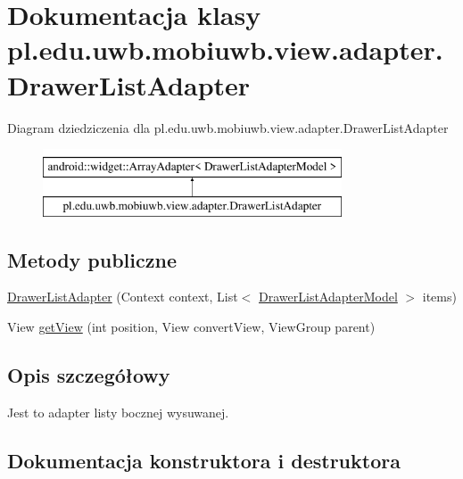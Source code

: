 \hypertarget{classpl_1_1edu_1_1uwb_1_1mobiuwb_1_1view_1_1adapter_1_1_drawer_list_adapter}{}\section{Dokumentacja klasy pl.\+edu.\+uwb.\+mobiuwb.\+view.\+adapter.\+Drawer\+List\+Adapter}
\label{classpl_1_1edu_1_1uwb_1_1mobiuwb_1_1view_1_1adapter_1_1_drawer_list_adapter}
Diagram dziedziczenia dla pl.\+edu.\+uwb.\+mobiuwb.\+view.\+adapter.\+Drawer\+List\+Adapter\begin{figure}[H]
\begin{center}
\leavevmode
\includegraphics[height=2.000000cm]{classpl_1_1edu_1_1uwb_1_1mobiuwb_1_1view_1_1adapter_1_1_drawer_list_adapter}
\end{center}
\end{figure}
\subsection*{Metody publiczne}
\begin{DoxyCompactItemize}
\item 
\hyperlink{classpl_1_1edu_1_1uwb_1_1mobiuwb_1_1view_1_1adapter_1_1_drawer_list_adapter_a2dbd069db7a9348ff181553f4289a347}{Drawer\+List\+Adapter} (Context context, List$<$ \hyperlink{classpl_1_1edu_1_1uwb_1_1mobiuwb_1_1view_1_1model_1_1_drawer_list_adapter_model}{Drawer\+List\+Adapter\+Model} $>$ items)
\item 
View \hyperlink{classpl_1_1edu_1_1uwb_1_1mobiuwb_1_1view_1_1adapter_1_1_drawer_list_adapter_aa019e0dd8af0ca96ff8cb5ec4a6c081a}{get\+View} (int position, View convert\+View, View\+Group parent)
\end{DoxyCompactItemize}


\subsection{Opis szczegółowy}
Jest to adapter listy bocznej wysuwanej. 

\subsection{Dokumentacja konstruktora i destruktora}
\hypertarget{classpl_1_1edu_1_1uwb_1_1mobiuwb_1_1view_1_1adapter_1_1_drawer_list_adapter_a2dbd069db7a9348ff181553f4289a347}{}
